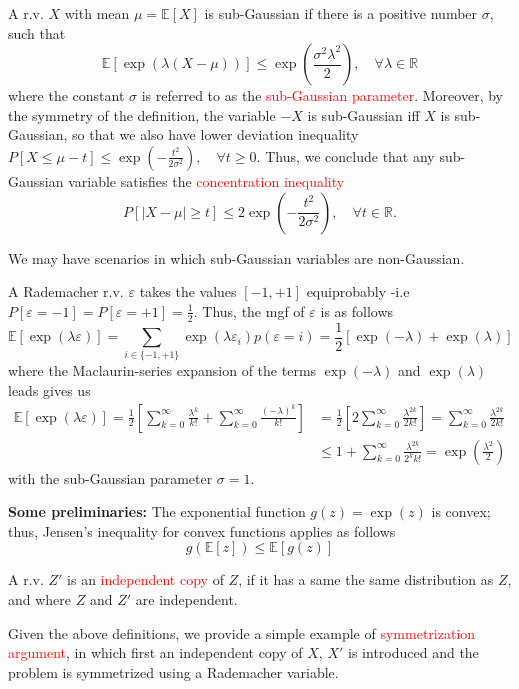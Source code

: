 \documentclass[10pt,handout,english]{beamer}
\newcommand{\E}{\mathbb{E}}
\newcommand{\R}{\mathbb{R}}
\begin{document}
\begin{frame}
\begin{definition}
A r.v. $X$ with mean $\mu=\E[X]$ is sub-Gaussian if there is a positive number $\sigma$, such that
\[
\E[\exp(\lambda(X-\mu))]\leq\exp\left(\frac{\sigma^2\lambda^2}{2}\right),\quad\forall\lambda\in\R
\]
where the constant $\sigma$ is referred to as the \textcolor{red}{sub-Gaussian parameter}. Moreover, by the symmetry of the definition, the variable $-X$ is sub-Gaussian iff $X$ is sub-Gaussian, so that we also have lower deviation inequality $P[X\leq\mu-t ]\leq\exp\left(-\frac{t^2}{2\sigma^2}\right), \quad\forall t\geq 0$. Thus, we conclude that any sub-Gaussian variable satisfies the \textcolor{red}{concentration inequality}
\[
P[\lvert X-\mu\rvert\geq t]\leq2\exp\left(-\frac{t^2}{2\sigma^2}\right),\quad\forall t\in\R.
\]
\end{definition}
\end{frame}
\begin{frame}
We may have scenarios in which sub-Gaussian variables are non-Gaussian.
\begin{example}
A Rademacher r.v. $\varepsilon$ takes the values $[-1,+1]$ equiprobably -i.e $P[\varepsilon=-1]=P[\varepsilon=+1]=\frac{1}{2}$. Thus, the mgf of $\varepsilon$ is as follows
\[
\E[\exp(\lambda \varepsilon)]=\sum_{i\in\{-1,+1\}} \exp(\lambda\varepsilon_i)p(\varepsilon=i)=\frac{1}{2}[\exp(-\lambda)+\exp(\lambda)]
\]
where the Maclaurin-series expansion of the terms $\exp(-\lambda)$ and $\exp(\lambda)$ leads gives us
\begin{align*}
\E[\exp(\lambda \varepsilon)]=\frac{1}{2}\left[\sum\limits_{k=0}^{\infty}\frac{\lambda^k}{k!}+\sum\limits_{k=0}^{\infty}\frac{(-\lambda)^k}{k!}\right]&=\frac{1}{2}\left[2\sum\limits_{k=0}^{\infty}\frac{\lambda^{2k}}{2k!}\right]=\sum\limits_{k=0}^{\infty}\frac{\lambda^{2k}}{2k!}\\
&\leq 1+\sum\limits_{k=0}^{\infty}\frac{\lambda^{2k}}{2^kk!}=\exp\left(\frac{\lambda^2}{2}\right)
\end{align*}
with the sub-Gaussian parameter $\sigma=1$.
\end{example}
\end{frame}

\begin{frame}
\textbf{Some preliminaries:}  The exponential function $g(z)=\exp(z)$ is convex; thus, Jensen's inequality for convex functions applies as follows
\[
g(\E[z])\leq \E[g(z)]
\] 

A r.v. $Z'$ is an \textcolor{red}{independent copy} of $Z$, if it has a same the same distribution as $Z$, and where $Z$ and $Z'$ are independent. 

Given the above definitions, we provide a simple example of \textcolor{red}{symmetrization argument}, in which first an independent copy of $X$, $X'$ is introduced and the problem is symmetrized using a Rademacher variable.
\end{frame}
\end{document}
